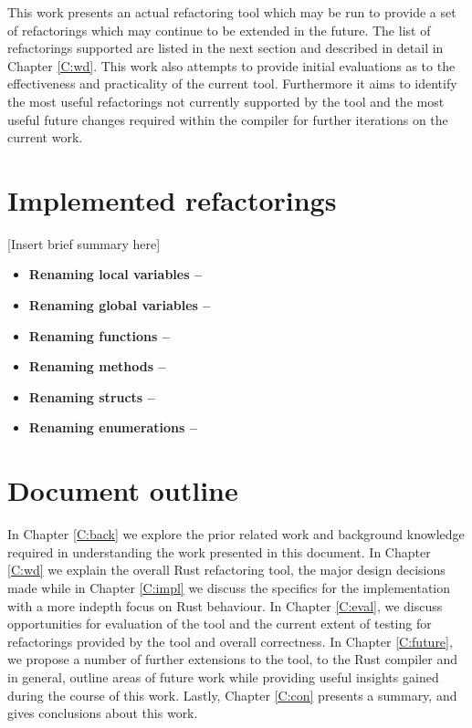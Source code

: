 This work presents an actual refactoring tool which may be run to provide a set of refactorings which may continue to be extended in the future. The list of refactorings supported are listed in the next section and described in detail in Chapter \ref{C:wd}. This work also attempts to provide initial evaluations as to the effectiveness and practicality of the current tool. Furthermore it aims to identify the most useful refactorings not currently supported by the tool and the most useful future changes required within the compiler for further iterations on the current work.

\section{Implemented refactorings}\label{S:implemented}
[Insert brief summary here]

\begin{itemize}
\item \bf{Renaming local variables} --
\item \bf{Renaming global variables} --
\item \bf{Renaming functions} --
\item \bf{Renaming methods} --
\item \bf{Renaming structs} -- 
\item \bf{Renaming enumerations} --
\end{itemize}

\section{Document outline}\label{S:outline}
In Chapter \ref{C:back} we explore the prior related work and background knowledge required in understanding the work presented in this document. In Chapter \ref{C:wd} we explain the overall Rust refactoring tool, the major design decisions made while in Chapter \ref{C:impl} we discuss the specifics for the implementation with a more indepth focus on Rust behaviour. In Chapter \ref{C:eval}, we discuss opportunities for evaluation of the tool and the current extent of testing for refactorings provided by the tool and overall correctness. In Chapter \ref{C:future}, we propose a number of further extensions to the tool, to the Rust compiler and in general, outline areas of future work while providing useful insights gained during the course of this work. Lastly, Chapter \ref{C:con} presents a summary, and gives conclusions about this work.